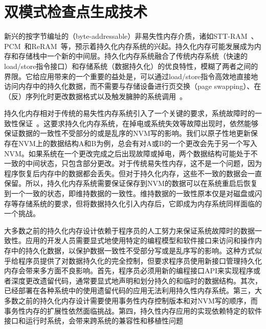 \chapter{双模式检查点生成技术}
\label{chap:thynvm}

新兴的按字节编址的（byte-addressable）非易失性内存介质，诸如STT-RAM~\cite{4443191,6557176}、PCM~\cite{Raoux:2008:PRA, 10.1109/MM.2010.24}和ReRAM~\cite{5607274}等，预示着持久化内存系统的兴起。持久化内存可能发展成为内存和存储栈中一个新的中间层。持久化内存系统融合了传统内存系统（快速的load/store指令接口）和存储系统（数据持久化）的优良特性，模糊了两者之间的界限。它给应用带来的一个重要的益处是，可以通过load/store指令高效地直接地访问内存中的持久化数据，而不需要与存储设备进行页交换（page swapping）、在（反）序列化时更改数据格式以及触发臃肿的系统调用~\cite{meza2013case}。

持久化内存相对于传统的易失性内存系统引入了一个关键的要求，系统故障时的一致性保证~\cite{Lamb:1991:ODS,Copeland:1989:CSR,Shapiro:1999:EFC:319151.319163}。这要求持久化内存系统，在掉电或系统失效等故障出现时，依然能够保证数据的一致性不受部分的或是乱序的NVM写的影响。我们以原子性地更新保存在NVM上的数据结构A和B为例，总会有对A或B的一个更改会先于另一个写入NVM。如果系统在一个更改完成之后出现故障或掉电，两个数据结构可能处于不一致的中间状态，只包含部分更改。对于传统易失性内存，这不是一个问题，因为程序恢复后内存中的数据都会丢失。但对于持久化内存，这些不一致的数据会一直保留。所以，持久化内存系统需要保证保存到NVM的数据可以在系统重启后恢复到一个一致的状态，即维持数据的一致性。维持数据的一致性原本仅是对磁盘或闪存等存储系统的要求，但将数据持久化引入内存后，它即成为内存系统同样面临的一个挑战。

大多数之前的持久化内存设计依赖于程序员的人工努力来保证系统故障时的数据一致性\cite{
  Volos:2011:MLP:1950365.1950379, Coburn:2011:NMP:1950365.1950380,
  Venkataraman:2011:CDD:1960475.1960480, Intel:PMEM,
  Zhao:2013:KCP:2540708.2540744, Pelley:2014:MP}。应用的开发人员需要显式地使用特定的编程模型和软件接口来访问和操作内存中的持久化数据，以保护数据一致性不受部分写或是乱序写的影响。这种方式似乎给程序员提供了对数据持久化的完全控制，但要求程序员使用新接口管理持久化内存会带来多方面不良影响。首先，程序员必须用新的编程接口API来实现程序或者深度更改遗留代码，通常要显式地声明和划分持久的和临时的数据结构。其次，已经部署在各种系统中的使用遗留代码的应用无法利用持久性内存系统。第三，大多数之前的持久化内存设计需要使用事务性内存控制版本和对NVM写的顺序，而事务性内存的扩展性依然面临挑战\cite{Cascaval:2008:STM:1454456.1454466, Pankratius:2011:STM:1989493.1989500, Dice:2009:EEC:1508244.1508263}。第四，持久性内存应用的实现依赖特定的软件接口和运行时系统\cite{Volos:2011:MLP:1950365.1950379, Coburn:2011:NMP:1950365.1950380, Venkataraman:2011:CDD:1960475.1960480, Intel:PMEM, SNIA:2013:NPM}，会带来跨系统的兼容性和移植性问题

